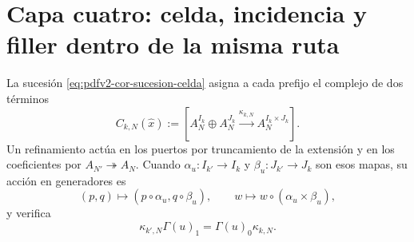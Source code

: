 \section{Capa cuatro: celda, incidencia y filler dentro de la misma ruta}

La sucesión \eqref{eq:pdfv2-cor-sucesion-celda} asigna a cada prefijo el
complejo de dos términos
\begin{equation}
\label{eq:pdfv2-cor-cono-celda}
 C_{k,N}(\widehat x):=
 \left[A_N^{I_k}\oplus A_N^{J_k}
 \xrightarrow{\kappa_{k,N}}A_N^{I_k\times J_k}\right].
\end{equation}
Un refinamiento actúa en los puertos por truncamiento de la extensión y en
los coeficientes por \(A_{N'}\twoheadrightarrow A_N\). Cuando
\(\alpha_u:I_{k'}\to I_k\) y \(\beta_u:J_{k'}\to J_k\) son esos mapas, su
acción en generadores es
\begin{equation}
\label{eq:pdfv2-cor-refinamiento-celda}
 (p,q)\longmapsto(p\circ\alpha_u,q\circ\beta_u),
 \qquad
 w\longmapsto w\circ(\alpha_u\times\beta_u),
\end{equation}
y verifica
\begin{equation}
\label{eq:pdfv2-cor-refinamiento-cadena}
 \kappa_{k',N}\Gamma(u)_1=\Gamma(u)_0\kappa_{k,N}.
\end{equation}


